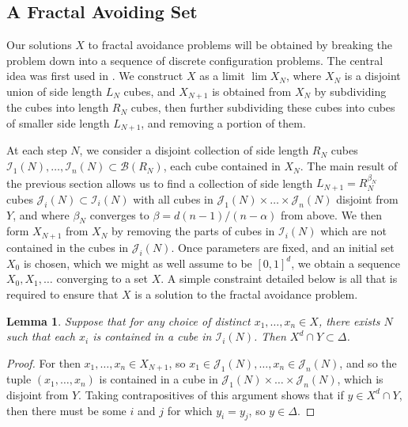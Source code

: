 \documentclass{article}
\theoremstyle{plain}
\newtheorem{lemma}{Lemma}
\theoremstyle{plain}
\begin{document}
\begin{multicols}{2}

\section{A Fractal Avoiding Set}

Our solutions $X$ to fractal avoidance problems will be obtained by breaking the problem down into a sequence of discrete configuration problems. The central idea was first used in \cite{MalabikaRob}. We construct $X$ as a limit $\lim X_N$, where $X_N$ is a disjoint union of side length $L_N$ cubes, and $X_{N+1}$ is obtained from $X_N$ by subdividing the cubes into length $R_N$ cubes, then further subdividing these cubes into cubes of smaller side length $L_{N+1}$, and removing a portion of them.

At each step $N$, we consider a disjoint collection of side length $R_N$ cubes $\mathcal{I}_1(N), \dots, \mathcal{I}_n(N) \subset \mathcal{B}(R_N)$, each cube contained in $X_N$. The main result of the previous section allows us to find a collection of side length $L_{N+1} = R_N^{\beta_N}$ cubes $\mathcal{J}_i(N) \subset \mathcal{I}_i(N)$ with all cubes in $\mathcal{J}_1(N) \times \dots \times \mathcal{J}_n(N)$ disjoint from $Y$, and where $\beta_N$ converges to $\beta = d(n-1)/(n-\alpha)$ from above. We then form $X_{N+1}$ from $X_N$ by removing the parts of cubes in $\mathcal{I}_i(N)$ which are not contained in the cubes in $\mathcal{J}_i(N)$. Once parameters are fixed, and an initial set $X_0$ is chosen, which we might as well assume to be $[0,1]^d$, we obtain a sequence $X_0, X_1, \dots$ converging to a set $X$. A simple constraint detailed below is all that is required to ensure that $X$ is a solution to the fractal avoidance problem.

\begin{lemma}
	Suppose that for any choice of distinct $x_1, \dots, x_n \in X$, there exists $N$ such that each $x_i$ is contained in a cube in $\mathcal{I}_i(N)$. Then $X^d \cap Y \subset \Delta$.
\end{lemma}
\begin{proof}
	For then $x_1, \dots, x_n \in X_{N+1}$, so $x_1 \in \mathcal{J}_1(N), \dots, x_n \in \mathcal{J}_n(N)$, and so the tuple $(x_1, \dots, x_n)$ is contained in a cube in $\mathcal{J}_1(N) \times \dots \times \mathcal{J}_n(N)$, which is disjoint from $Y$. Taking contrapositives of this argument shows that if $y \in X^d \cap Y$, then there must be some $i$ and $j$ for which $y_i = y_j$, so $y \in \Delta$.
\end{proof}


\end{multicols}
\end{document}
